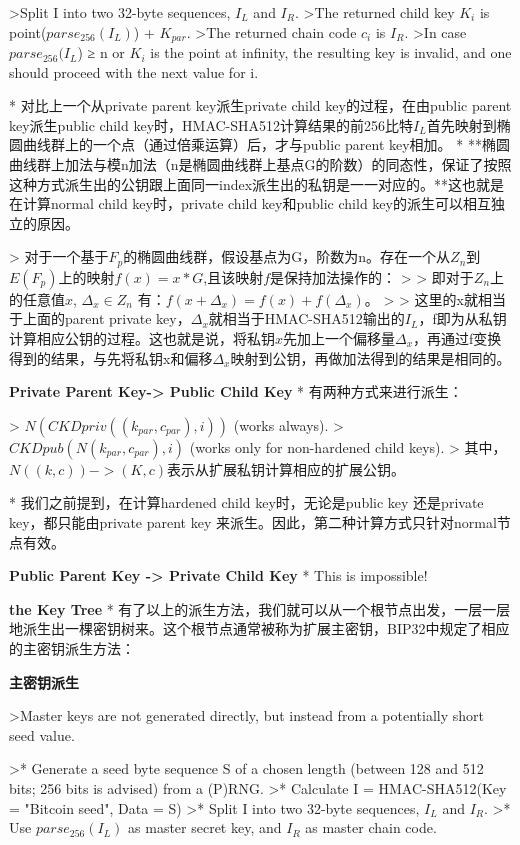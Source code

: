 \documentclass{article}
\begin{document}
>Split I into two 32-byte sequences, $I_L$ and $I_R$.  
>The returned child key $K_i$ is point($parse_{256}(I_L)$) + $K_{par}$.  
>The returned chain code $c_i$ is $I_R$.  
>In case $parse_{256}(I_L$) ≥ n or $K_i$ is the point at infinity, the resulting key is invalid, and one should proceed with the next value for i.

* 对比上一个从private parent key派生private child key的过程，在由public parent key派生public child key时，HMAC-SHA512计算结果的前256比特$I_L$首先映射到椭圆曲线群上的一个点（通过倍乘运算）后，才与public parent key相加。
* **椭圆曲线群上加法与模n加法（n是椭圆曲线群上基点G的阶数）的同态性，保证了按照这种方式派生出的公钥跟上面同一index派生出的私钥是一一对应的。**这也就是在计算normal child key时，private child key和public child key的派生可以相互独立的原因。

> 对于一个基于$F_p$的椭圆曲线群，假设基点为G，阶数为n。存在一个从$Z_n$到$E(F_p)$上的映射$f(x)=x*G$,且该映射$f$是保持加法操作的：
> > 即对于$Z_n$上的任意值$x$, $\Delta_x \in Z_n$ 有：$f(x+\Delta_x)=f(x)+f(\Delta_x)$。   
> 
> 这里的x就相当于上面的parent private key，$\Delta_x$就相当于HMAC-SHA512输出的$I_L$，f即为从私钥计算相应公钥的过程。这也就是说，将私钥$x$先加上一个偏移量$\Delta_x$，再通过f变换得到的结果，与先将私钥x和偏移$\Delta_x$映射到公钥，再做加法得到的结果是相同的。

\textbf{Private Parent Key-> Public Child Key}
* 有两种方式来进行派生：

> $N(CKDpriv((k_{par}, c_{par}), i))$ (works always).  
> $CKDpub(N(k_{par}, c_{par}), i)$ (works only for non-hardened child keys).  
> 其中，$N((k, c)) -> (K, c)$表示从扩展私钥计算相应的扩展公钥。

* 我们之前提到，在计算hardened child key时，无论是public key 还是private key，都只能由private parent key 来派生。因此，第二种计算方式只针对normal节点有效。

\textbf{Public Parent Key -> Private Child Key}
* This is impossible!

\textbf{the Key Tree}
* 有了以上的派生方法，我们就可以从一个根节点出发，一层一层地派生出一棵密钥树来。这个根节点通常被称为扩展主密钥，BIP32中规定了相应的主密钥派生方法：

\textbf{主密钥派生}

>Master keys are not generated directly, but instead from a potentially short seed value.

>* Generate a seed byte sequence S of a chosen length (between 128 and 512 bits; 256 bits is advised) from a (P)RNG.
>* Calculate I = HMAC-SHA512(Key = "Bitcoin seed", Data = S)
>* Split I into two 32-byte sequences, $I_L$ and $I_R$.
>* Use $parse_{256}(I_L)$ as master secret key, and $I_R$ as master chain code.
 
\end{document}
